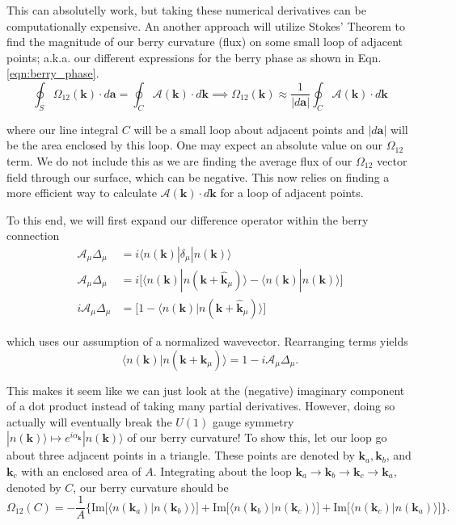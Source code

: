 \documentclass[12pt]{revtex4-2}
\newcommand{\imag}{\text{Im}}
\begin{document}
This can absolutelly work, but taking these numerical derivatives can be computationally expensive.  An another approach will utilize Stokes' Theorem to find the magnitude of our berry curvature (flux) on some small loop of adjacent points; a.k.a. our different expressions for the berry phase as shown in Eqn. \ref{eqn:berry_phase}.
\begin{equation}
    \oint_S \Omega_{12}(\mathbf{k})\cdot d\mathbf{a} = \oint_C \mathcal{A}(\mathbf{k})\cdot d\mathbf{k} \implies \Omega_{12}(\mathbf{k}) \approx \frac{1}{|d\mathbf{a}|}\oint_C \mathcal{A}(\mathbf{k})\cdot d\mathbf{k}
\end{equation}

where our line integral $C$ will be a small loop about adjacent points and $|d\mathbf{a}|$ will be the area enclosed by this loop.  One may expect an absolute value on our $\Omega_{12}$ term.  We do not include this as we are finding the average flux of our $\Omega_{12}$ vector field through our surface, which can be negative. This now relies on finding a more efficient way to calculate $\mathcal{A}(\mathbf{k})\cdot d\mathbf{k}$ for a loop of adjacent points. \par 

To this end, we will first expand our difference operator within the berry connection
\begin{align}
    \mathcal{A}_\mu \Delta_\mu &= i\langle n(\mathbf{k}) | \delta_\mu | n(\mathbf{k}) \rangle \\
    \mathcal{A}_\mu \Delta_\mu &= i\big[ \langle n(\mathbf{k}) | n(\mathbf{k} + \hat{\mathbf{k}}_\mu) \rangle - \langle n(\mathbf{k}) | n(\mathbf{k}) \rangle \big] \\
    i\mathcal{A}_\mu \Delta_\mu &= \big[1 - \langle n(\mathbf{k}) | n(\mathbf{k} + \hat{\mathbf{k}}_\mu) \rangle\big]
\end{align}

which uses our assumption of a normalized wavevector.  Rearranging terms yields 
\begin{equation}\label{eqn:fukui_1}
    \langle n(\mathbf{k}) | n(\mathbf{k} + \hat{\mathbf{k}}_\mu) \rangle = 1 - i\mathcal{A}_\mu \Delta_\mu.
\end{equation}

This makes it seem like we can just look at the (negative) imaginary component of a dot product instead of taking many partial derivatives.  However, doing so actually will eventually break the $U(1)$ gauge symmetry $|n(\mathbf{k})\rangle \mapsto e^{i \alpha_\mathbf{k}}|n(\mathbf{k})\rangle$ of our berry curvature!  To show this, let our loop go about three adjacent points in a triangle.  These points are denoted by $\mathbf{k}_a,\mathbf{k}_b$, and $\mathbf{k}_c$ with an enclosed area of $A$.  Integrating about the loop $\mathbf{k}_a \to \mathbf{k}_b \to \mathbf{k}_c \to \mathbf{k}_a$, denoted by $C$, our berry curvature should be 
\begin{equation}
    \Omega_{12}(C) = -\frac{1}{A}\Big\{ \imag\big[\langle n(\mathbf{k}_a)| n(\mathbf{k}_b)\rangle\big] + \imag\big[\langle n(\mathbf{k}_b)| n(\mathbf{k}_c)\rangle \big] + \imag\big[\langle n(\mathbf{k}_c)| n(\mathbf{k}_a)\rangle\big] \Big\}.
\end{equation}
\end{document}
